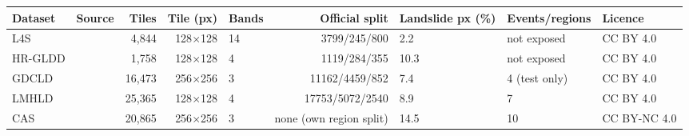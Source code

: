 \begin{tabular}{llrrlrlll}
\toprule
Dataset & Source & Tiles & Tile (px) & Bands & Official split & Landslide px (\%) & Events/regions & Licence \\
\midrule
L4S & \cite{ghorbanzadeh2022} & 4{,}844 & 128$\times$128 & 14 & 3799/245/800 & 2.2 & not exposed & CC BY 4.0 \\
HR-GLDD & \cite{meena2023hrgldd} & 1{,}758 & 128$\times$128 & 4 & 1119/284/355 & 10.3 & not exposed & CC BY 4.0 \\
GDCLD & \cite{fang2024gdcld} & 16{,}473 & 256$\times$256 & 3 & 11162/4459/852 & 7.4 & 4 (test only) & CC BY 4.0 \\
LMHLD & \cite{liu2025lmhld} & 25{,}365 & 128$\times$128 & 4 & 17753/5072/2540 & 8.9 & 7 & CC BY 4.0 \\
CAS & \cite{xu2024cas} & 20{,}865 & 256$\times$256 & 3 & none (own region split) & 14.5 & 10 & CC BY-NC 4.0 \\
\bottomrule
\end{tabular}
